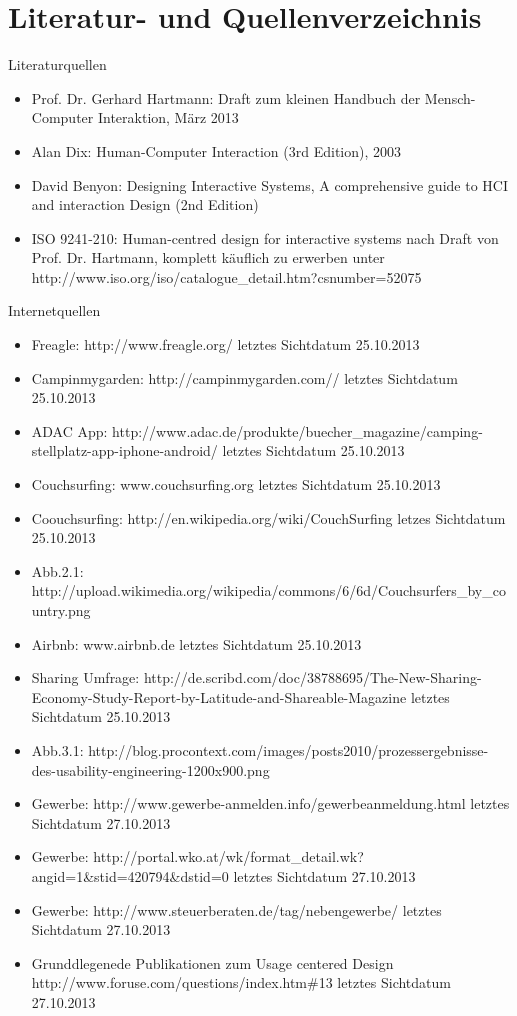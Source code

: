 

\chapter{Literatur- und Quellenverzeichnis}

Literaturquellen 
\begin{itemize}
\item
Prof. Dr. Gerhard Hartmann: Draft zum kleinen Handbuch der Mensch-Computer Interaktion, März 2013
\item
Alan Dix: Human-Computer Interaction (3rd Edition), 2003
\item 
David Benyon: Designing Interactive Systems, A comprehensive guide to HCI and interaction Design (2nd Edition) 
\item
ISO 9241-210: Human-centred design for interactive systems nach Draft von Prof. Dr. Hartmann, komplett käuflich zu erwerben unter \\http://www.iso.org/iso/catalogue\_detail.htm?csnumber=52075

\end{itemize}

Internetquellen 
\begin{itemize}
\item
Freagle: http://www.freagle.org/ letztes Sichtdatum 25.10.2013
\item
Campinmygarden: http://campinmygarden.com// letztes Sichtdatum 25.10.2013
\item
ADAC App: http://www.adac.de/produkte/buecher\_magazine/camping-stellplatz-app-iphone-android/ letztes Sichtdatum 25.10.2013
\item
Couchsurfing: www.couchsurfing.org letztes Sichtdatum 25.10.2013
\item
Coouchsurfing: http://en.wikipedia.org/wiki/CouchSurfing letzes Sichtdatum 25.10.2013
\item
Abb.2.1: http://upload.wikimedia.org/wikipedia/commons/6/6d/Couchsurfers\_by\_country.png
\item
Airbnb: www.airbnb.de letztes Sichtdatum 25.10.2013
\item
Sharing Umfrage: http://de.scribd.com/doc/38788695/The-New-Sharing-Economy-Study-Report-by-Latitude-and-Shareable-Magazine letztes Sichtdatum 25.10.2013
\item
Abb.3.1: http://blog.procontext.com/images/posts2010/prozessergebnisse-des-usability-engineering-1200x900.png
\item
Gewerbe: http://www.gewerbe-anmelden.info/gewerbeanmeldung.html letztes Sichtdatum 27.10.2013
\item
Gewerbe: http://portal.wko.at/wk/format\_detail.wk?angid=1\&stid=420794\&dstid=0 letztes Sichtdatum 27.10.2013
\item
Gewerbe: http://www.steuerberaten.de/tag/nebengewerbe/ letztes Sichtdatum 27.10.2013
\item
Grunddlegenede Publikationen zum Usage centered Design \\http://www.foruse.com/questions/index.htm\#13 letztes Sichtdatum 27.10.2013


\end{itemize}

\newpage
